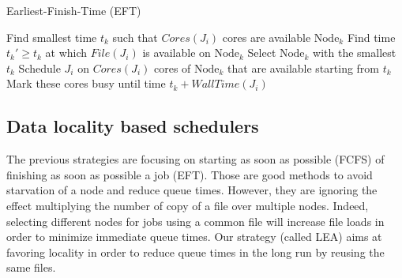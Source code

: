 \documentclass[conference,10pt]{IEEEtran}
\newcommand{\Node}[1]{\ensuremath{\mathrm{Node}_{#1}}\xspace}
\newcommand{\file}{\ensuremath{\mathit{File}}\xspace}
\newcommand{\size}{\ensuremath{\mathit{Size}}\xspace}
\newcommand{\bandwidth}{\mathit{BandWidth}\xspace}
\newcommand{\core}{\mathit{Cores}\xspace}
\newcommand{\walltime}{\mathit{WallTime}\xspace}
\newcommand{\start}{\mathit{StartTime}\xspace}
\newcommand{\nodeset}{\ensuremath{\mathbb{N}}\xspace}
\begin{document}
		
\begin{algorithm}[htbp]%
\caption{Earliest-Finish-Time (EFT)}\label{algo.eft}
\begin{algorithmic}[1]
		\ForEach{$\Node{k} \in \nodeset$}
			\State Find smallest time $t_k$ such that $\core(J_i)$ cores are available \Node{k}
			\State Find time $t_k' \geq t_k$ at which $\file(J_i)$ is available on $\Node{k}$ %
		\EndFor
                \State Select \Node{k}  with the smallest $t_k$
                \State Schedule $J_i$ on $\core(J_i)$ cores of \Node{k} that are available starting from $t_k$
                \State Mark these cores busy until time $t_k +\walltime(J_i)$
	\EndFor
\end{algorithmic}
\end{algorithm}

\subsection{Data locality based schedulers}

The previous strategies are focusing on starting as soon as possible (FCFS)
of finishing as soon as possible a job (EFT).
Those are good methods to avoid starvation of a node and reduce queue times.
However, they are ignoring the effect multiplying the number of copy of a file
over multiple nodes. Indeed, selecting different nodes for jobs using a common
file will increase file loads in order to minimize immediate queue times.
Our strategy (called LEA) aims at favoring locality in order to reduce
queue times in the long run by reusing the same files. 
\end{document}
